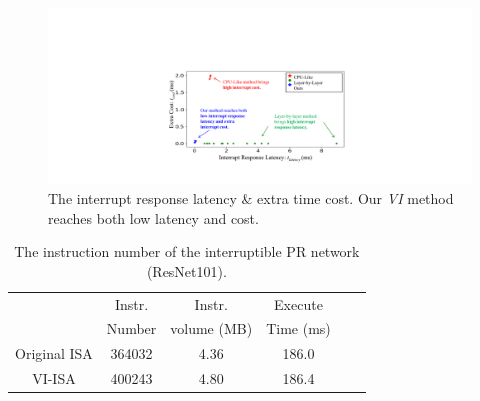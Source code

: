 \begin{figure}[t]
 \centering
 \includegraphics[width=0.99\linewidth]{fig/PRresult.pdf}
 \vspace{-9mm}
 \caption{The interrupt response latency \& extra time cost. Our \textit{VI} method reaches both low latency and cost.}
 \label{fig:scatter1024}
\end{figure}
\begin{table}[t]
 \small
 \centering
 \caption{The instruction number of the interruptible PR network (ResNet101). }
\begin{tabular}{|c|c|c|c|c|c|}
 \hline
  & Instr. & Instr. & Execute \\
 & Number & volume (MB) & Time (ms) \\
 \hline
 Original ISA & 364032 & 4.36 & 186.0 \\
 \hline
 VI-ISA & 400243 & 4.80 & 186.4 \\
 \hline
 \end{tabular}%
 \label{tab:instrnum}%
\end{table}%



